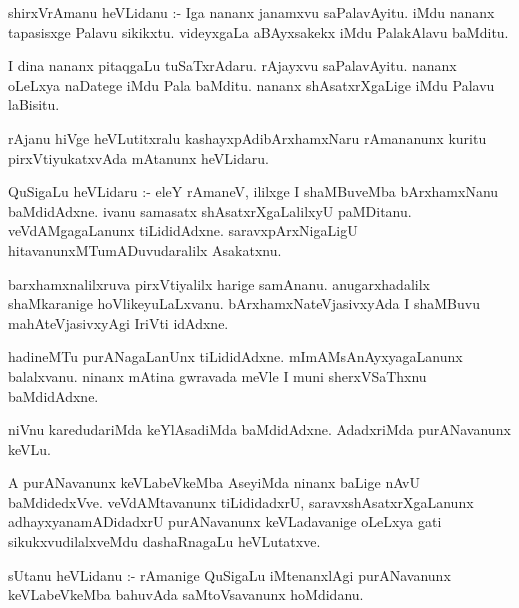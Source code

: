 \documentclass{article}
\begin{document}
\begin{mn}
shirxVrAmanu  heVLidanu :- Iga  nananx  janamxvu  saPalavAyitu.  iMdu  nananx  tapasisxge  Palavu  sikikxtu.  videyxgaLa  
aBAyxsakekx  iMdu  PalakAlavu  baMditu.
\end{mn}

\begin{mn}
I dina  nananx  pitaqgaLu  tuSaTxrAdaru.  rAjayxvu  saPalavAyitu.  nananx  oLeLxya  naDatege  iMdu  Pala  baMditu.  nananx  
shAsatxrXgaLige  iMdu  Palavu laBisitu.
\end{mn}

\begin{mn}
rAjanu  hiVge  heVLutitxralu  kashayxpAdibArxhamxNaru  rAmananunx  kuritu  pirxVtiyukatxvAda  mAtanunx  heVLidaru.
\end{mn}

\begin{mn}
QuSigaLu  heVLidaru :- eleY  rAmaneV,  ililxge  I  shaMBuveMba  bArxhamxNanu  baMdidAdxne.  ivanu  samasatx  shAsatxrXgaLalilxyU  
paMDitanu.  veVdAMgagaLanunx  tiLididAdxne.  saravxpArxNigaLigU  hitavanunxMTumADuvudaralilx  Asakatxnu.
\end{mn}

\begin{mn}
barxhamxnalilxruva  pirxVtiyalilx  harige  samAnanu.  anugarxhadalilx  shaMkaranige  hoVlikeyuLaLxvanu.  bArxhamxNateVjasivxyAda  
I  shaMBuvu  mahAteVjasivxyAgi  IriVti  idAdxne.
\end{mn}

\begin{mn}
hadineMTu  purANagaLanUnx  tiLididAdxne.  mImAMsAnAyxyagaLanunx  balalxvanu.  ninanx  mAtina  gwravada  meVle  I  muni sherxVSaThxnu  baMdidAdxne.
\end{mn}

\begin{mn}
niVnu  karedudariMda  keYlAsadiMda  baMdidAdxne.  AdadxriMda  purANavanunx  keVLu.
\end{mn}

\begin{mn}
A  purANavanunx  keVLabeVkeMba  AseyiMda  ninanx  baLige  nAvU  baMdidedxVve.  veVdAMtavanunx  tiLididadxrU,  saravxshAsatxrXgaLanunx  
adhayxyanamADidadxrU  purANavanunx  keVLadavanige  oLeLxya  gati  sikukxvudilalxveMdu  dashaRnagaLu  heVLutatxve.
\end{mn}

\begin{mn}
sUtanu  heVLidanu :- rAmanige  QuSigaLu  iMtenanxlAgi  purANavanunx  keVLabeVkeMba  bahuvAda  saMtoVsavanunx  hoMdidanu.
\end{mn}
\end{document}

